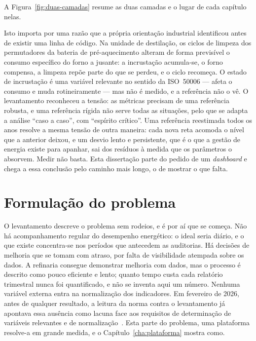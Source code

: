 A Figura~\ref{fig:duas-camadas} resume as duas camadas e o lugar de cada capítulo nelas.



Isto importa por uma razão que a própria orientação industrial
identificou antes de existir uma linha de código. Na unidade de
destilação, os ciclos de limpeza dos permutadores da bateria de
pré-aquecimento alteram de forma previsível o consumo específico do forno
a jusante: a incrustação acumula-se, o forno compensa, a limpeza repõe
parte do que se perdeu, e o ciclo recomeça. O estado de incrustação é uma
variável relevante no sentido da ISO~50006 --- afeta o consumo e muda
rotineiramente --- mas não é medido, e a referência não o vê. O
levantamento reconheceu a tensão: as métricas precisam de uma referência
robusta, e uma referência rígida não serve todas as situações, pelo que
se adapta a análise \enquote{caso a caso}, com \enquote{espírito
crítico}. Uma referência reestimada todos os anos resolve a mesma
tensão de outra maneira: cada nova reta acomoda o nível que a anterior
deixou, e um desvio lento e persistente, que é o que a gestão de energia
existe para apanhar, sai dos resíduos à medida que os parâmetros o
absorvem. Medir não basta. Esta dissertação parte do
pedido de um \emph{dashboard} e chega a essa conclusão pelo caminho mais
longo, o de mostrar o que falta.

\section{Formulação do problema}
\label{sec:problema}

O levantamento descreve o problema sem rodeios, e é por aí que se
começa. Não há acompanhamento regular do desempenho energético: o ideal
seria diário, e o que existe concentra-se nos períodos que antecedem as
auditorias. Há decisões de melhoria que se tomam com atraso, por falta de
visibilidade atempada sobre os dados. A refinaria consegue demonstrar
melhoria com dados, mas o processo é descrito como pouco eficiente e
lento; quanto tempo custa cada relatório trimestral nunca foi
quantificado, e não se inventa aqui um número. Nenhuma variável externa
entra na normalização dos indicadores. Em fevereiro de 2026, antes de
qualquer resultado, a leitura da norma contra o levantamento já apontava
essa ausência como lacuna face aos requisitos de determinação de
variáveis relevantes e de normalização~\cite[\S6.4--6.5]{ISO50001_2018}.
Esta parte do problema, uma plataforma resolve-a em grande medida, e o
Capítulo~\ref{cha:plataforma} mostra como.

